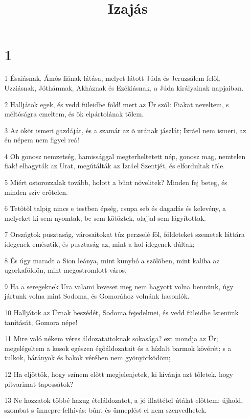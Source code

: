 

\title{Izajás}


\chapter{1}

\par 1 Ésaiásnak, Ámós fiának látása, melyet látott Júda és Jeruzsálem felõl, Uzziásnak, Jóthámnak, Akháznak és Ezékiásnak, a Júda királyainak napjaiban.
\par 2 Halljátok egek, és vedd füleidbe föld! mert az Úr szól: Fiakat neveltem, s  méltóságra emeltem, és õk elpártolának tõlem.
\par 3 Az ökör ismeri gazdáját, és a szamár az õ urának jászlát; Izráel nem ismeri, az én népem nem figyel reá!
\par 4 Oh gonosz nemzetség, hamissággal megterheltetett nép, gonosz mag, nemtelen fiak! elhagyták  az Urat, megútálták az Izráel Szentjét, és elfordultak tõle.
\par 5 Miért ostorozzalak tovább, holott a bûnt növelitek? Minden fej beteg, és minden szív erõtelen.
\par 6 Tetõtõl talpig nincs e testben épség, csupa seb és dagadás és kelevény, a melyeket ki sem nyomtak, be sem kötöztek, olajjal sem lágyítottak.
\par 7 Országtok pusztaság, városaitokat tûz perzselé föl, földeteket szemetek láttára idegenek emésztik, és pusztaság az, mint a hol idegenek dúltak;
\par 8 És úgy maradt a Sion leánya, mint kunyhó a szõlõben, mint kaliba az ugorkaföldön, mint megostromlott város.
\par 9 Ha a seregeknek Ura valami keveset meg nem hagyott volna bennünk, úgy jártunk volna mint Sodoma, és Gomorához  volnánk hasonlók.
\par 10 Halljátok az Úrnak beszédét, Sodoma fejedelmei, és vedd füleidbe Istenünk tanítását, Gomora népe!
\par 11 Mire való nékem véres áldozataitoknak sokasága? ezt mondja az Úr; megelégeltem a kosok egészen égõáldozatait és a hízlalt barmok kövérét; s a tulkok, bárányok és bakok vérében nem gyönyörködöm;
\par 12 Ha eljöttök, hogy színem elõtt megjelenjetek, ki kivánja azt tõletek, hogy pitvarimat tapossátok?
\par 13 Ne hozzatok többé hazug ételáldozatot, a jó illattétel útálat elõttem; újhold, szombat s ünnepre-felhívás: bûnt és ünneplést el nem szenvedhetek.
